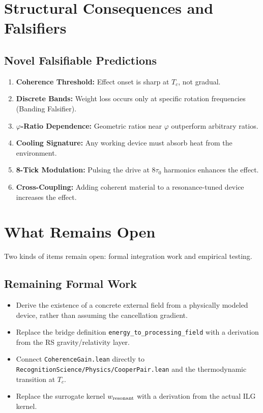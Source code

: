 \documentclass[11pt,a4paper]{article}
\newcommand{\lean}[1]{\texttt{\small #1}}
\begin{document}
\section{Structural Consequences and Falsifiers}
\label{sec:experiment}

\subsection{Novel Falsifiable Predictions}

\begin{enumerate}[leftmargin=2em]
    \item \textbf{Coherence Threshold:} Effect onset is sharp at $T_c$, not gradual.
    \item \textbf{Discrete Bands:} Weight loss occurs only at specific rotation frequencies (Banding Falsifier).
    \item \textbf{$\varphi$-Ratio Dependence:} Geometric ratios near $\varphi$ outperform arbitrary ratios.
    \item \textbf{Cooling Signature:} Any working device must absorb heat from the environment.
    \item \textbf{8-Tick Modulation:} Pulsing the drive at $8\tau_0$ harmonics enhances the effect.
    \item \textbf{Cross-Coupling:} Adding coherent material to a resonance-tuned device increases the effect.
\end{enumerate}

\section{What Remains Open}
\label{sec:empirical}

Two kinds of items remain open: formal integration work and empirical testing.

\subsection{Remaining Formal Work}

\begin{itemize}[leftmargin=2em]
    \item Derive the existence of a concrete external field from a physically modeled device, rather than assuming the cancellation gradient.
    \item Replace the bridge definition \lean{energy\_to\_processing\_field} with a derivation from the RS gravity/relativity layer.
    \item Connect \texttt{CoherenceGain.lean} directly to \texttt{RecognitionScience/Physics/CooperPair.lean} and the thermodynamic transition at $T_c$.
    \item Replace the surrogate kernel $w_{\rm resonant}$ with a derivation from the actual ILG kernel.
\end{itemize}
\end{document}
